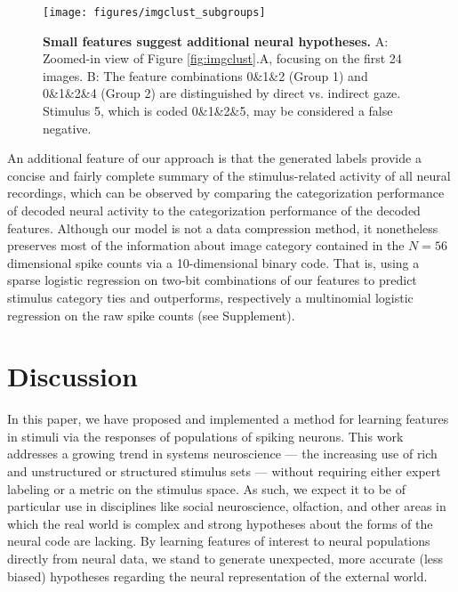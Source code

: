\documentclass{nature}
\begin{document}
\begin{figure}
    \texttt{[image: figures/imgclust\_subgroups]}
	\caption{\textbf{Small features suggest additional neural hypotheses.}
	A: Zoomed-in view of Figure \ref{fig:imgclust}.A, focusing on the first 24 images. B: The feature combinations 0\&1\&2 (Group 1) and 0\&1\&2\&4 (Group 2) are distinguished by direct vs. indirect gaze. Stimulus 5, which is coded 0\&1\&2\&5, may be considered a false negative.}
	\label{fig:imgclust_sub}
\end{figure}

An additional feature of our approach is that the generated labels provide a concise and fairly complete summary of the stimulus-related activity of all neural recordings, which can be observed by comparing the categorization performance of decoded neural activity to the categorization performance of the decoded features. Although our model is not a data compression method, it nonetheless preserves most of the information about image category contained in the $N=56$ dimensional spike counts via a 10-dimensional binary code. That is, using a sparse logistic regression on two-bit combinations of our features to predict stimulus category ties and outperforms, respectively a multinomial logistic regression on the raw spike counts (see Supplement).

\section*{Discussion}



In this paper, we have proposed and implemented a method for learning features in stimuli via the responses of populations of spiking neurons. This work addresses a growing trend in systems neuroscience --- the increasing use of rich and unstructured or structured stimulus sets --- without requiring either expert labeling or a metric on the stimulus space. As such, we expect it to be of particular use in disciplines like social neuroscience, olfaction, and other areas in which the real world is complex and strong hypotheses about the forms of the neural code are lacking. By learning features of interest to neural populations directly from neural data, we stand to generate unexpected, more accurate (less biased) hypotheses regarding the neural representation of the external world.
\end{document}
